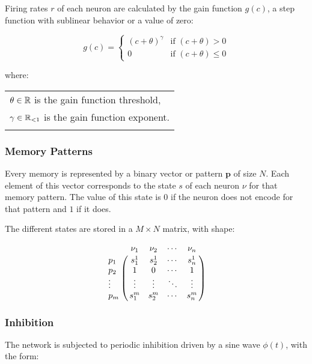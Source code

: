 Firing rates \(r\) of each neuron are calculated by the gain function \(g(c)\), a step function with sublinear behavior or a value of zero:

        \begin{equation}
            g(c) =
            \begin{cases}
                (c + \theta)^{\gamma}   & \text{if~} (c + \theta) > 0 \\
                0                       & \text{if~} (c + \theta) \leq 0
            \end{cases}
        \label{eq:firing_rates} \end{equation}

        where:

        \begin{tabular}{l} \\
            \(\theta \in \mathbb{R}\) is the gain function threshold, \\
            \(\gamma \in \mathbb{R}_{<1}\) is the gain function exponent. \\
        \label{tab:conditions_firing_rates} \end{tabular} \bigskip


\subsubsection{Memory Patterns}

Every memory is represented by a binary vector or pattern \(\boldsymbol{p}\) of size \(N\).
Each element of this vector corresponds to the state \(s\) of each neuron \(\nu\) for that memory pattern.
The value of this state is \(0\) if the neuron does not encode for that pattern and \(1\) if it does.

The different states are stored in a \(M \times N\) matrix, with shape:

    \[\bordermatrix{
        ~ & \nu_1 & \nu_2 & \cdots & \nu_n  \cr
        p_1 &  s_{1}^{1} & s_{2}^{1} & \cdots & s_{n}^{1}  \cr
        p_2 &  1 & 0 & \cdots & 1  \cr
        \vdots &  \vdots  & \vdots & \ddots & \vdots  \cr
        p_m &  s_{1}^{m} & s_{2}^{m} & \cdots & s_{n}^{m}
    }\]


\subsubsection{Inhibition}


    The network is subjected to periodic inhibition driven by a sine wave \(\phi(t)\), with the form:

